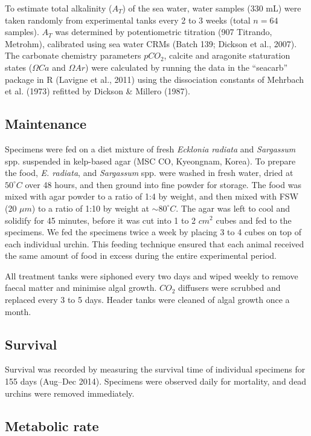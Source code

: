 \documentclass[oneside, a4paper]{memoir}
\theoremstyle{definition}
\theoremstyle{definition}
\theoremstyle{definition}
\theoremstyle{remark}
\begin{document}
To estimate total alkalinity (\(A_T\)) of the sea water, water samples
(330 mL) were taken randomly from experimental tanks every 2 to 3 weeks
(total \(n = 64\) samples). \(A_T\) was determined by potentiometric
titration (907 Titrando, Metrohm), calibrated using sea water CRMs
(Batch 139; Dickson et al., 2007). The carbonate chemistry parameters
\(pCO_2\), calcite and aragonite staturation states (\(\Omega Ca\) and
\(\Omega Ar\)) were calculated by running the data in the
\enquote{seacarb} package in R (Lavigne et al., 2011) using the
dissociation constants of Mehrbach et al. (1973) refitted by Dickson \&
Millero (1987).

\subsection{Maintenance}\label{maintenance}

Specimens were fed on a diet mixture of fresh \emph{Ecklonia radiata}
and \emph{Sargassum} spp. suspended in kelp-based agar (MSC CO,
Kyeongnam, Korea). To prepare the food, \emph{E. radiata}, and
\emph{Sargassum} spp. were washed in fresh water, dried at
\(50^{\circ}C\) over 48 hours, and then ground into fine powder for
storage. The food was mixed with agar powder to a ratio of 1:4 by
weight, and then mixed with FSW (20 \(\mu m\)) to a ratio of 1:10 by
weight at \(\sim 80 ^{\circ}C\). The agar was left to cool and solidify
for 45 minutes, before it was cut into 1 to 2 \(cm^2\) cubes and fed to
the specimens. We fed the specimens twice a week by placing 3 to 4 cubes
on top of each individual urchin. This feeding technique ensured that
each animal received the same amount of food in excess during the entire
experimental period.

All treatment tanks were siphoned every two days and wiped weekly to
remove faecal matter and minimise algal growth. \(CO_2\) diffusers were
scrubbed and replaced every 3 to 5 days. Header tanks were cleaned of
algal growth once a month.

\subsection{Survival}\label{survival}

Survival was recorded by measuring the survival time of individual
specimens for 155 days (Aug--Dec 2014). Specimens were observed daily
for mortality, and dead urchins were removed immediately.

\subsection{Metabolic rate}\label{metabolic-rate}
\end{document}
